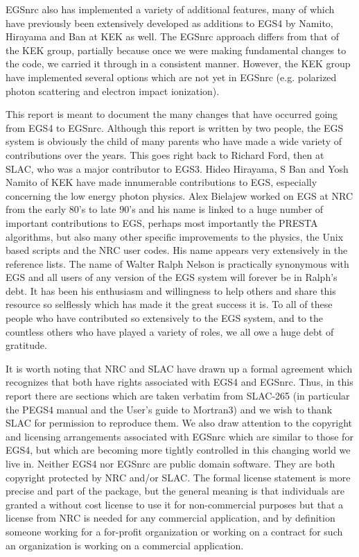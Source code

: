 EGSnrc also has implemented a variety of additional features, many of
which have previously been extensively developed as additions to EGS4
by  Namito, Hirayama and Ban at KEK as well\cite{Na98,Na95a,Na94,Na93}.
The EGSnrc approach differs from that of the KEK group, partially because
once we were making fundamental changes to the code, we carried it through
in a consistent manner. However, the KEK group have implemented several
options which are not yet in EGSnrc (e.g.  polarized photon scattering
and electron impact ionization).
  

This report is meant to document the many changes that have occurred going
from EGS4 to EGSnrc.  Although this report is written by two people,
the EGS system is obviously the child of many parents who have made a
wide variety of contributions over the years.  This goes right back to
Richard Ford, then at SLAC, who was a major contributor to EGS3. Hideo
Hirayama, S Ban  and Yosh Namito of KEK have made innumerable contributions
to EGS, especially concerning the low energy photon physics. Alex
Bielajew worked on EGS at NRC from the early 80's to late 90's and his
name is linked to a huge number of important contributions to EGS,
perhaps most importantly the PRESTA algorithms, but also many other
specific improvements to the physics, the Unix based scripts and the NRC
user codes. His name appears very extensively in the reference lists.
The name of Walter Ralph Nelson is practically synonymous with EGS and
all users of any version of the EGS system will forever be in Ralph's
debt. It has been his enthusiasm and willingness to help others and share
this resource so selflessly which has made it the great success it is.
To all of these people who have contributed so extensively to the EGS
system, and to the countless others who have played a variety of roles,
we all owe a huge debt of gratitude.


It is worth noting that NRC and SLAC have drawn up a formal agreement which
recognizes that both have rights associated with EGS4 and EGSnrc.  Thus, in
this report there are sections which are taken verbatim from SLAC-265 (in
particular the PEGS4 manual and the User's guide to Mortran3) and we wish
to thank SLAC for permission to reproduce them.  We also draw attention to
the copyright and licensing arrangements associated with EGSnrc which are
similar to those for EGS4, but which are becoming more tightly controlled
in this changing world we live in.  Neither EGS4 nor EGSnrc are public
domain software. They are both copyright protected by NRC and/or SLAC. The
formal license statement is more precise and part of the package, but the
general meaning is that individuals are granted a without cost 
license to use it for non-commercial purposes but that a license from NRC
is needed for any commercial application, and by definition someone working
for a for-profit organization or working on a contract for such an
organization is working on a commercial application.


